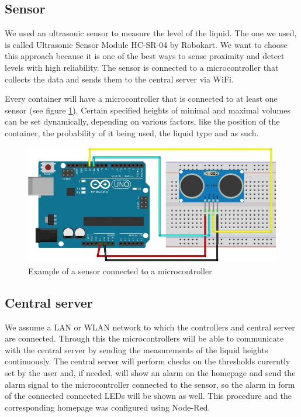 \documentclass{article}
\begin{document}
\subsection{Sensor}
We used an ultrasonic sensor to measure the level of the liquid. The one we
used, is called Ultrasonic Sensor Module HC-SR-04 by Robokart. We want to choose
this approach because it is one of the best ways to sense proximity and detect
levels with high reliability. The sensor is connected to a microcontroller that
collects the data and sends them to the central server via WiFi.

Every container will have a microcontroller that is connected to at least one
sensor (see figure \ref{sensorWithArduino}). Certain specified heights of
minimal and maximal volumes can be set dynamically, depending on various
factors, like the position of the container, the probability of it being used,
the liquid type and as such.

\begin{figure}[h]
  \includegraphics[scale=0.5]{sensorAndArduino.jpg}
  \caption{Example of a sensor connected to a microcontroller}
  \label{sensorWithArduino}
\end{figure}

\subsection{Central server}

We assume a LAN or WLAN network to which the controllers and central server are
connected. Through this the microcontrollers will be able to communicate with
the central server by sending the measurements of the liquid heights
continuously. The central server will perform checks on the thresholds curerntly
set by the user and, if needed, will show an alarm on the homepage and send the
alarm signal to the microcontroller connected to the sensor, so the alarm in
form of the connected connected LEDs will be shown as well. This procedure and
the corresponding homepage was configured using Node-Red.
\end{document}
